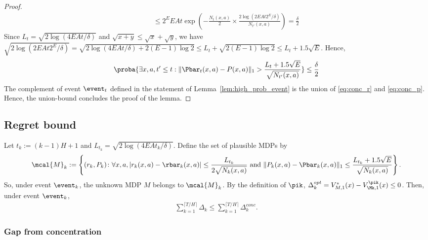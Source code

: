 \begin{proof}
\begin{align*}
                &\qquad \le 2^EEAt\exp\left(-\frac{N_t(x,a)}{2}\times\frac{2\log(2EAt2^E/\delta)}{N_{t'}(x,a)}\right) =\frac{\delta}2
                \end{align*}
                Since $L_t=\sqrt{2\log(4EAt/\delta)}$ and $\sqrt{x+y}\le\sqrt{x}+\sqrt{y}$, we have $\sqrt{2\log(2EAt2^E/\delta)}=\sqrt{2\log(4EAt/\delta) +2(E-1)\log2}\le L_t + \sqrt{2(E-1)\log2} \le L_t +1.5\sqrt{E}$.
                Hence,
                \begin{align}
                \label{eq:conc_p}
                \proba{\exists x,a, t'\le t: \Vert\Pbar_t(x,a)-P(x,a)\Vert_1 >\frac{L_t+1.5\sqrt{E}}{\sqrt{N_{t'}(x,a)}}} \le \frac{\delta}2
                \end{align}
                The complement of event $\event_t$ defined in the statement of Lemma~\ref{lem:high_prob_event} is the union of \eqref{eq:conc_r} and \eqref{eq:conc_p}.
                Hence, the union-bound concludes the proof of the lemma.
            \end{proof}
    
    \subsection{Regret bound}
    \label{subsec:regret_ucrl2}
    
        Let $t_k:=(k-1)H+1$ and $L_{t_k}=\sqrt{2\log(4EAt_k/\delta)}$.
        Define the set of plausible MDPs by
        \begin{align*}
            \mcal{M}_k :=\left\{(r_k,P_k) \colon \forall x,a, \vert r_k(x,a)-\rbar_k(x,a)\vert \le \frac{L_{t_k}}{2\sqrt{N_k(x,a)}} \text{ and } \Vert P_k(x,a)-\Pbar_k(x,a)\Vert_1\le \frac{L_{t_k}+1.5\sqrt{E}}{\sqrt{N_k(x,a)}}\right\}.
        \end{align*}
        So, under event $\event_k$, the unknown MDP $M$ belongs to $\mcal{M}_k$.
        By the definition of $\pik$, $\Delta_k^{opt}=V^*_{M,1}(x) -V^{\pik}_{\Mk,1}(x)\le0$.
        Then, under event $\event_k$,
        \begin{align*}
            \sum_{k=1}^{\lceil T/H\rceil}\Delta_k \le \sum_{k=1}^{\lceil T/H\rceil}\Delta_k^{conc}.
        \end{align*}
        
        \subsubsection{Gap from concentration}
        \label{subsubsec:sec_gap_conc}
        
